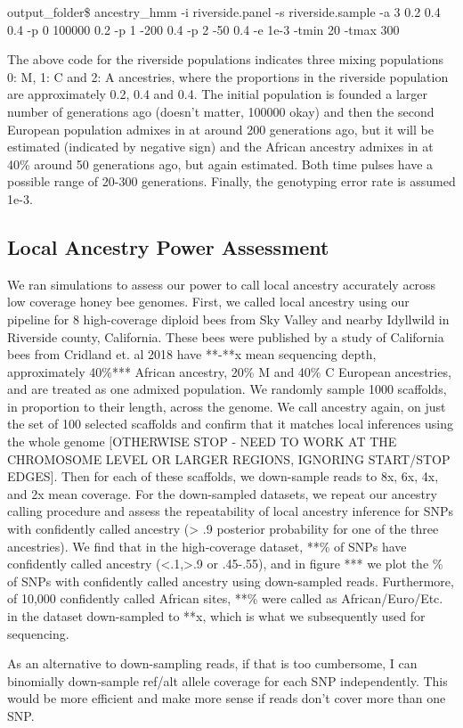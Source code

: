 \documentclass[12pt]{report}
\begin{document}
output\_folder\$ ancestry\_hmm -i riverside.panel -s riverside.sample -a 3 0.2 0.4 0.4 -p 0 100000 0.2 -p 1 -200 0.4 -p 2 -50 0.4 -e 1e-3 -tmin 20 -tmax 300 \par
The above code for the riverside populations indicates three mixing populations 0: M, 1: C and 2: A ancestries, where the proportions in the riverside population are approximately 0.2, 0.4 and 0.4. The initial population is founded a larger number of generations ago (doesn't matter, 100000 okay) and then the second European population admixes in at around 200 generations ago, but it will be estimated (indicated by negative sign) and the African ancestry admixes in at 40\% around 50 generations ago, but again estimated. Both time pulses have a possible range of 20-300 generations. Finally, the genotyping error rate is assumed 1e-3. \par

\subsection{Local Ancestry Power Assessment}
We ran simulations to assess our power to call local ancestry accurately across low coverage honey bee genomes. First, we called local ancestry using our pipeline for 8 high-coverage diploid bees from Sky Valley and nearby Idyllwild in Riverside county, California. These bees were published by a study of California bees from Cridland et. al 2018 have **-**x mean sequencing depth, approximately 40\%*** African ancestry, 20\% M and 40\% C European ancestries, and are treated as one admixed population. We randomly sample 1000 scaffolds, in proportion to their length, across the genome. We call ancestry again, on just the set of 100 selected scaffolds and confirm that it matches local inferences using the whole genome [OTHERWISE STOP - NEED TO WORK AT THE CHROMOSOME LEVEL OR LARGER REGIONS, IGNORING START/STOP EDGES]. Then for each of these scaffolds, we down-sample reads to 8x, 6x, 4x, and 2x mean coverage. For the down-sampled datasets, we repeat our ancestry calling procedure and assess the repeatability of local ancestry inference for SNPs with confidently called ancestry (> .9 posterior probability for one of the three ancestries). We find that in the high-coverage dataset, **\% of SNPs have confidently called ancestry (<.1,>.9 or .45-.55), and in figure *** we plot the \% of SNPs with confidently called ancestry using down-sampled reads. Furthermore, of 10,000 confidently called African sites, **\% were called as African/Euro/Etc. in the dataset down-sampled to **x, which is what we subsequently used for sequencing. \par
As an alternative to down-sampling reads, if that is too cumbersome, I can binomially down-sample ref/alt allele coverage for each SNP independently. This would be more efficient and make more sense if reads don't cover more than one SNP.
\end{document}
